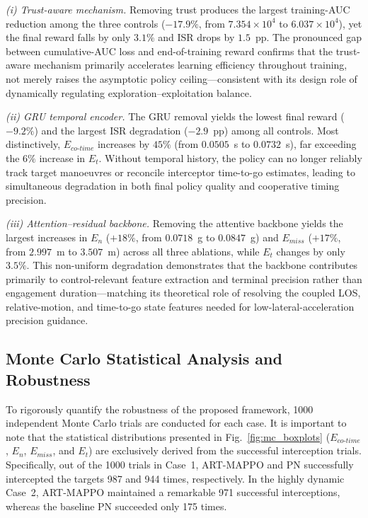 \documentclass[lettersize,journal]{IEEEtran}
\newcommand{\hladd}[1]{{\color{blue}#1}}
\begin{document}
\hladd{\emph{(i) Trust-aware mechanism.}  Removing trust produces the largest training-AUC
reduction among the three controls ($-17.9\%$, from $7.354\!\times\!10^4$ to
$6.037\!\times\!10^4$), yet the final reward falls by only $3.1\%$ and ISR drops by
$1.5$~pp.  The pronounced gap between cumulative-AUC loss and end-of-training reward confirms
that the trust-aware mechanism primarily accelerates learning efficiency throughout training,
not merely raises the asymptotic policy ceiling---consistent with its design role of
dynamically regulating exploration--exploitation balance.}

\hladd{\emph{(ii) GRU temporal encoder.}  The GRU removal yields the lowest final reward
($-9.2\%$) and the largest ISR degradation ($-2.9$~pp) among all controls.  Most
distinctively, $E_{co\text{-}time}$ increases by $45\%$ (from $0.0505$~s to $0.0732$~s),
far exceeding the $6\%$ increase in $E_t$.  Without temporal history, the policy can no
longer reliably track target manoeuvres or reconcile interceptor time-to-go estimates,
leading to simultaneous degradation in both final policy quality and cooperative timing
precision.}

\hladd{\emph{(iii) Attention--residual backbone.}  Removing the attentive backbone yields the
largest increases in $E_n$ ($+18\%$, from $0.0718$~g to $0.0847$~g) and $E_{miss}$
($+17\%$, from $2.997$~m to $3.507$~m) across all three ablations, while $E_t$ changes by
only $3.5\%$.  This non-uniform degradation demonstrates that the backbone contributes
primarily to control-relevant feature extraction and terminal precision rather than
engagement duration---matching its theoretical role of resolving the coupled LOS,
relative-motion, and time-to-go state features needed for low-lateral-acceleration precision guidance.}

\subsection{Monte Carlo Statistical Analysis and Robustness}
\label{subsec:montecarlo}

To rigorously quantify the robustness of the proposed framework, 1000 independent Monte Carlo trials are conducted for each case. It is important to note that the statistical distributions presented in Fig.~\ref{fig:mc_boxplots} ($E_{co\text{-}time}$, $E_n$, $E_{miss}$, and $E_t$) are exclusively derived from the successful interception trials. Specifically, out of the 1000 trials in Case~1, ART-MAPPO and PN successfully intercepted the targets 987 and 944 times, respectively. In the highly dynamic Case~2, ART-MAPPO maintained a remarkable 971 successful interceptions, whereas the baseline PN succeeded only 175 times.
\end{document}
